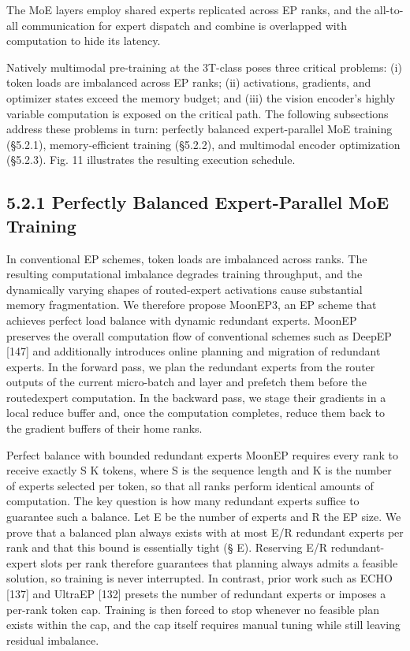 \documentclass[
  10
]{article}
\begin{document}
The MoE layers employ shared experts replicated across EP ranks, and the
all-to-all communication for expert dispatch and combine is overlapped
with computation to hide its latency.

Natively multimodal pre-training at the 3T-class poses three critical
problems: (i) token loads are imbalanced across EP ranks; (ii)
activations, gradients, and optimizer states exceed the memory budget;
and (iii) the vision encoder's highly variable computation is exposed on
the critical path. The following subsections address these problems in
turn: perfectly balanced expert-parallel MoE training (§5.2.1),
memory-efficient training (§5.2.2), and multimodal encoder optimization
(§5.2.3). Fig. 11 illustrates the resulting execution schedule.

\subsection{5.2.1 Perfectly Balanced Expert-Parallel MoE
Training}\label{perfectly-balanced-expert-parallel-moe-training}

In conventional EP schemes, token loads are imbalanced across ranks. The
resulting computational imbalance degrades training throughput, and the
dynamically varying shapes of routed-expert activations cause
substantial memory fragmentation. We therefore propose MoonEP3, an EP
scheme that achieves perfect load balance with dynamic redundant
experts. MoonEP preserves the overall computation flow of conventional
schemes such as DeepEP {[}147{]} and additionally introduces online
planning and migration of redundant experts. In the forward pass, we
plan the redundant experts from the router outputs of the current
micro-batch and layer and prefetch them before the routedexpert
computation. In the backward pass, we stage their gradients in a local
reduce buffer and, once the computation completes, reduce them back to
the gradient buffers of their home ranks.

Perfect balance with bounded redundant experts MoonEP requires every
rank to receive exactly S K tokens, where S is the sequence length and K
is the number of experts selected per token, so that all ranks perform
identical amounts of computation. The key question is how many redundant
experts suffice to guarantee such a balance. Let E be the number of
experts and R the EP size. We prove that a balanced plan always exists
with at most E/R redundant experts per rank and that this bound is
essentially tight (§ E). Reserving E/R redundant-expert slots per rank
therefore guarantees that planning always admits a feasible solution, so
training is never interrupted. In contrast, prior work such as ECHO
{[}137{]} and UltraEP {[}132{]} presets the number of redundant experts
or imposes a per-rank token cap. Training is then forced to stop
whenever no feasible plan exists within the cap, and the cap itself
requires manual tuning while still leaving residual imbalance.
\end{document}

